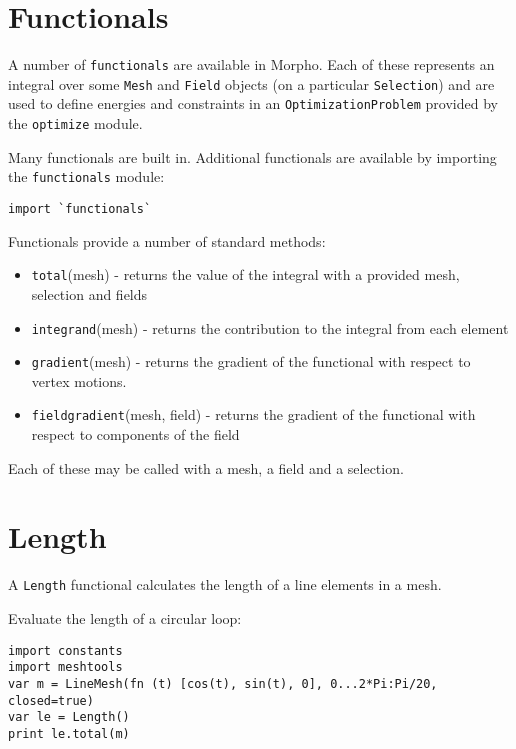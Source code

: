 \hypertarget{functionals}{%
\section{Functionals}\label{functionals}}

A number of \texttt{functionals} are available in Morpho. Each of these
represents an integral over some \texttt{Mesh} and \texttt{Field}
objects (on a particular \texttt{Selection}) and are used to define
energies and constraints in an \texttt{OptimizationProblem} provided by
the \texttt{optimize} module.

Many functionals are built in. Additional functionals are available by
importing the \texttt{functionals} module:

\begin{lstlisting}
import `functionals`
\end{lstlisting}

Functionals provide a number of standard methods:

\begin{itemize}

\item
  \texttt{total}(mesh) - returns the value of the integral with a
  provided mesh, selection and fields
\item
  \texttt{integrand}(mesh) - returns the contribution to the integral
  from each element
\item
  \texttt{gradient}(mesh) - returns the gradient of the functional with
  respect to vertex motions.
\item
  \texttt{fieldgradient}(mesh, field) - returns the gradient of the
  functional with respect to components of the field
\end{itemize}

Each of these may be called with a mesh, a field and a selection.

\hypertarget{length}{%
\section{Length}\label{length}}

A \texttt{Length} functional calculates the length of a line elements in
a mesh.

Evaluate the length of a circular loop:

\begin{lstlisting}
import constants
import meshtools
var m = LineMesh(fn (t) [cos(t), sin(t), 0], 0...2*Pi:Pi/20, closed=true)
var le = Length()
print le.total(m)
\end{lstlisting}

